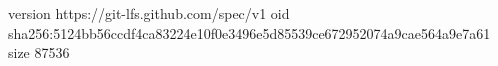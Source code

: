 version https://git-lfs.github.com/spec/v1
oid sha256:5124bb56ccdf4ca83224e10f0e3496e5d85539ce672952074a9cae564a9e7a61
size 87536
